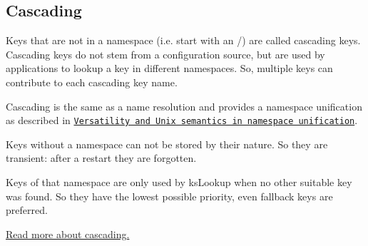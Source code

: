\subsection*{Cascading}

Keys that are not in a namespace (i.\+e. start with an {\ttfamily /}) are called cascading keys. Cascading keys do not stem from a configuration source, but are used by applications to lookup a key in different namespaces. So, multiple keys can contribute to each cascading key name.

Cascading is the same as a name resolution and provides a namespace unification as described in \href{http://citeseerx.ist.psu.edu/viewdoc/summary?doi=10.1.1.81.7888}{\tt Versatility and Unix semantics in namespace unification}.

Keys without a namespace can not be stored by their nature. So they are transient\+: after a restart they are forgotten.

Keys of that namespace are only used by ks\+Lookup when no other suitable key was found. So they have the lowest possible priority, even fallback keys are preferred.

\hyperlink{doc_help_elektra-cascading_md}{Read more about cascading.} 